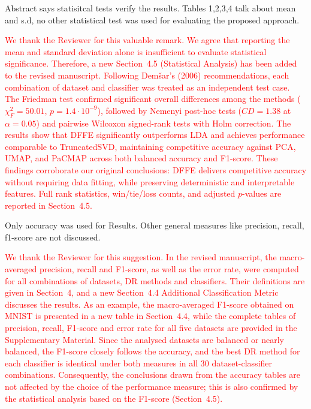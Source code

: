 \documentclass{ar2rc}
\begin{document}
\RC %
Abstract says statisitcal tests verify the results. Tables 1,2,3,4 talk about mean and s.d, no other statistical test was used for evaluating the proposed approach.

\AR
\textcolor{red}{We thank the Reviewer for this valuable remark. We agree that reporting the mean and standard deviation alone is insufficient to evaluate statistical significance. Therefore, a new Section~4.5 (Statistical Analysis) has been added to the revised manuscript. Following Dem\v{s}ar's (2006) recommendations, each combination of dataset and classifier was treated as an independent test case. The Friedman test confirmed significant overall differences among the methods ($\chi^2_F = 50.01$, $p = 1.4 \cdot 10^{-9}$), followed by Nemenyi post-hoc tests ($CD = 1.38$ at $\alpha = 0.05$) and pairwise Wilcoxon signed-rank tests with Holm correction. The results show that DFFE significantly outperforms LDA and achieves performance comparable to TruncatedSVD, maintaining competitive accuracy against PCA, UMAP, and PaCMAP across both balanced accuracy and F1-score. These findings corroborate our original conclusions: DFFE delivers competitive accuracy without requiring data fitting, while preserving deterministic and interpretable features. Full rank statistics, win/tie/loss counts, and adjusted $p$-values are reported in Section~4.5.}

\RC %
Only accuracy was used for Results. Other general measures like precision, recall, f1-score are not discussed.


\AR
\textcolor{red}{We thank the Reviewer for this suggestion. In the revised manuscript, the macro-averaged precision, recall and F1-score, as well as the error rate, were computed for all combinations of datasets, DR methods and classifiers. Their definitions are given in Section~4, and a new Section~4.4 Additional Classification Metric discusses the results. As an example, the macro-averaged F1-score obtained on MNIST is presented in a new table in Section~4.4, while the complete tables of precision, recall, F1-score and error rate for all five datasets are provided in the Supplementary Material. Since the analysed datasets are balanced or nearly balanced, the F1-score closely follows the accuracy, and the best DR method for each classifier is identical under both measures in all 30 dataset-classifier combinations. Consequently, the conclusions drawn from the accuracy tables are not affected by the choice of the performance measure; this is also confirmed by the statistical analysis based on the F1-score (Section~4.5).}
\end{document}
